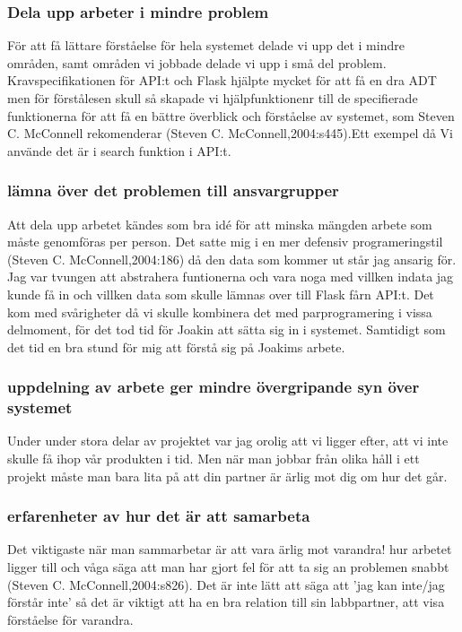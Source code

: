 \documentclass{TDP003mall}
\begin{document}
\subsubsection{Dela upp arbeter i mindre problem}
För att få lättare förståelse för hela systemet delade vi upp det i mindre områden, samt områden vi jobbade delade vi upp i små del problem. Kravspecifikationen för API:t och Flask hjälpte mycket för att få en dra ADT men för förstålesen skull så skapade vi hjälpfunktionenr till de specifierade funktionerna för att få en bättre överblick och förståelse av systemet, som Steven C. McConnell rekomenderar (Steven C. McConnell,2004:s445).Ett exempel då Vi använde det är i search funktion i API:t.
\subsubsection{lämna över det problemen till ansvargrupper}
Att dela upp arbetet kändes som bra idé för att minska mängden arbete som måste genomföras per person. Det satte mig i en mer defensiv programeringstil (Steven C. McConnell,2004:186) då den data som kommer ut står jag ansarig för. Jag var tvungen att abstrahera funtionerna och vara noga med villken indata jag kunde få in och villken data som skulle lämnas over till Flask fårn API:t. Det kom med svårigheter då vi skulle kombinera det med parprogramering i vissa delmoment, för det tod tid för Joakin att sätta sig in i systemet. Samtidigt som det tid en bra stund för mig att förstå sig på Joakims arbete.
\subsubsection{uppdelning av arbete ger mindre övergripande syn över systemet}
Under under stora delar av projektet var jag orolig att vi ligger efter, att vi inte skulle få ihop vår produkten i tid. Men när man jobbar från olika håll i ett projekt måste man bara lita på att din partner är ärlig mot dig om hur det går. 
\subsubsection{erfarenheter av hur det är att samarbeta}
Det viktigaste när man sammarbetar är att vara ärlig mot varandra! hur arbetet ligger till och våga säga att man har gjort fel för att ta sig an problemen snabbt (Steven C. McConnell,2004:s826). Det är inte lätt att säga att 'jag kan inte/jag förstår inte' så det är viktigt att ha en bra relation till sin labbpartner, att visa förståelse för varandra.
\end{document}
